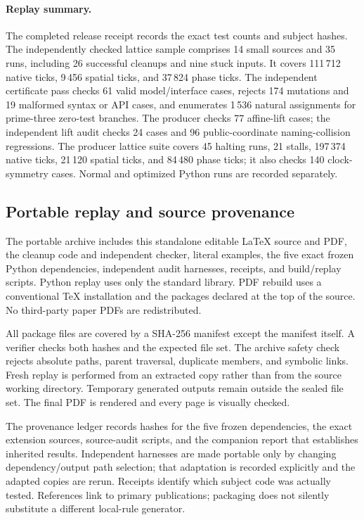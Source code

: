 \documentclass[11pt,letterpaper]{article}
\numberwithin{equation}{section}
\theoremstyle{definition}
\theoremstyle{remark}
\begin{document}
\paragraph{Replay summary.} The completed release receipt records the exact test counts and subject hashes. The independently checked lattice sample comprises 14 small sources and 35 runs, including 26 successful cleanups and nine stuck inputs. It covers 111\,712 native ticks, 9\,456 spatial ticks, and 37\,824 phase ticks. The independent certificate pass checks 61 valid model/interface cases, rejects 174 mutations and 19 malformed syntax or API cases, and enumerates 1\,536 natural assignments for prime-three zero-test branches. The producer checks 77 affine-lift cases; the independent lift audit checks 24 cases and 96 public-coordinate naming-collision regressions. The producer lattice suite covers 45 halting runs, 21 stalls, 197\,374 native ticks, 21\,120 spatial ticks, and 84\,480 phase ticks; it also checks 140 clock-symmetry cases. Normal and optimized Python runs are recorded separately.

\subsection{Portable replay and source provenance}

The portable archive includes this standalone editable LaTeX source and PDF, the cleanup code and independent checker, literal examples, the five exact frozen Python dependencies, independent audit harnesses, receipts, and build/replay scripts. Python replay uses only the standard library. PDF rebuild uses a conventional TeX installation and the packages declared at the top of the source. No third-party paper PDFs are redistributed.

All package files are covered by a SHA-256 manifest except the manifest itself. A verifier checks both hashes and the expected file set. The archive safety check rejects absolute paths, parent traversal, duplicate members, and symbolic links. Fresh replay is performed from an extracted copy rather than from the source working directory. Temporary generated outputs remain outside the sealed file set. The final PDF is rendered and every page is visually checked.

The provenance ledger records hashes for the five frozen dependencies, the exact extension sources, source-audit scripts, and the companion report that establishes inherited results. Independent harnesses are made portable only by changing dependency/output path selection; that adaptation is recorded explicitly and the adapted copies are rerun. Receipts identify which subject code was actually tested. References link to primary publications; packaging does not silently substitute a different local-rule generator.
\end{document}
